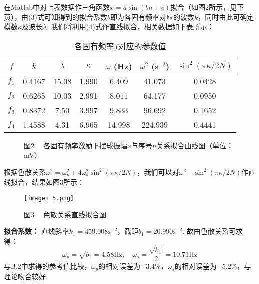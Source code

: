 \documentclass{ctexart}
\begin{document}
在Matlab中对上表数据作三角函数$x=a\sin(bn+c)$拟合（如图2所示，见下页），由(3)式可知得到的拟合系数$b$即为各固有频率对应的波数$k$，同时由此可确定模数$\kappa$及波长$\lambda$. 我们将利用(4)式作直线拟合，相关数据如下表所示：\\
\begin{table}[!htbp]
  \small
  \centering
  \caption{各固有频率$f$对应的参数值}\vspace{0.3em} \label{tab:aStrangeTable}%
  \begin{tabular}{c|cccccc}
  \toprule
   $f$& $k$& $\lambda$& $\kappa$& $\omega$ (Hz)&$\omega^2$ ($\mathrm{s^{-2}}$)& $\sin^2(\pi\kappa/2N)$\\
  \midrule
   $f_1$& 0.4167& 15.08& 1.990&   6.409      &41.073    & 0.0428\\
    $f_2$& 0.6265& 10.03& 2.991&  8.011     &64.177     & 0.0950\\
    $f_3$& 0.8372& 7.50&  3.997&  9.833    &96.692      &0.1652\\
    $f_4$& 1.4588& 4.31& 6.965&   14.998    &224.939    & 0.4441\\ 
  \bottomrule
  \end{tabular}
  \end{table}
\clearpage
\begin{figure}[htbp]
  \centering
  \quad    
  \quad
  \quad
  \caption*{图$2.\quad $各固有频率激励下摆球振幅$x$与序号$n$关系拟合曲线图（单位：mV）}
\end{figure}

\noindent 根据色散关系$\omega^2=\omega_p^2+4\omega_s^2\sin^2(\pi\kappa/2N)$，我们可以对$\omega^2$—$\sin^2(\pi\kappa/2N)$作直线拟合，结果如图3所示：\\
\begin{figure}[!htbp]
  \centering
  \texttt{[image: 5.png]}
  \caption*{图$3.\quad $色散关系直线拟合图}
\end{figure}

\noindent \textbf{拟合系数：} 直线斜率$k_1=459.008 \mathrm{s^{-2}}$，截距$b_1=20.990 \mathrm{s^{-2}}$. 故由色散关系可求得：
\begin{equation*}
  \omega_p=\sqrt{b_1}=4.58\mathrm{Hz},\quad \omega_s=\frac{\sqrt{k_1}}{2}=10.71\mathrm{Hz}
\end{equation*}
与B.2中求得的参考值比较，$\omega_p$的相对误差为$+3.4\%$，$\omega_s$的相对误差为$-5.2\%$，与理论吻合较好.
\clearpage
\end{document}
